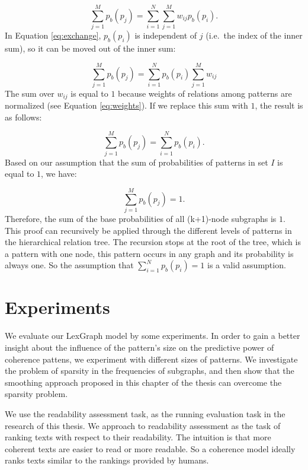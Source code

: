 \begin{equation}
\label{eq:exchange}
\sum_{j=1}^M p_b(p_j) = \sum_{i=1}^N \sum_{j=1}^M w_{ij}p_b(p_i).
\end{equation}
%
In Equation \ref{eq:exchange}, $p_b(p_i)$ is independent of $j$ (i.e.\ the index of the inner sum), so it can be moved out of the inner sum:

\begin{equation}
\sum_{j=1}^M p_b(p_j) = \sum_{i=1}^N p_b(p_i) \sum_{j=1}^M w_{ij}
\end{equation}
%
The sum over $w_{ij}$ is equal to $1$ because weights of relations among patterns are normalized (see Equation \ref{eq:weights}).   
If we replace this sum with $1$, the result is as follows:

\begin{equation}
\sum_{j=1}^M p_b(p_j) = \sum_{i=1}^N p_b(p_i).
\end{equation}
%
Based on our assumption that the sum of probabilities of patterns in set $I$ is equal to $1$, we have: 

\begin{equation}
\sum_{j=1}^M p_b(p_j) = 1.
\end{equation}
%
Therefore, the sum of the base probabilities of all (k+1)-node subgraphs is $1$. 
This proof can recursively be applied through the different levels of patterns in the hierarchical relation tree. 
The recursion stops at the root of the tree, which is a pattern with one node, this pattern occurs in any graph and its probability is always one. 
So the assumption that $\sum_{i=1}^N p_b(p_i) = 1$ is a valid assumption. 
\QEDB

\section{Experiments}
\label{sec:experiments}

We evaluate our LexGraph model by some experiments.  
In order to gain a better insight about the influence of the pattern's size on the predictive power of coherence pattens, we experiment with different sizes of patterns. 
We investigate the problem of sparsity in the frequencies of subgraphs, and then show that the smoothing approach proposed in this chapter of the thesis can overcome the sparsity problem. 


We use the readability assessment task, as the running evaluation task in the research of this thesis.
We approach to readability assessment as the task of ranking texts with respect to their readability. 
The intuition is that more coherent texts are easier to
read or more readable. 
So a coherence model ideally ranks texts similar to the rankings provided by humans.  

